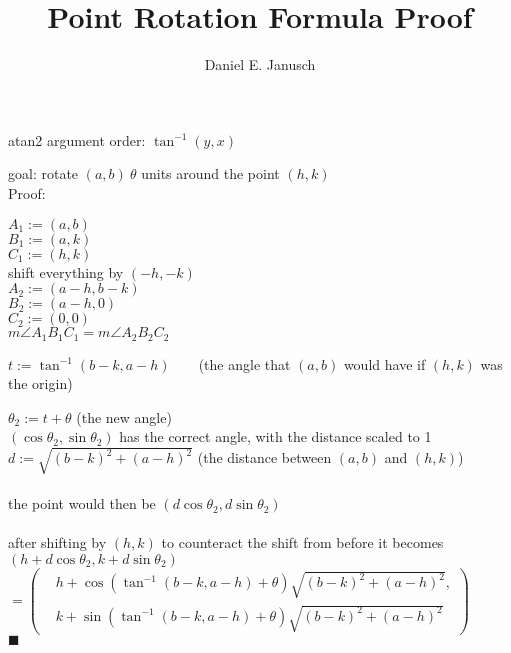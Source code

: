 \documentclass[12pt]{article}
\newcommand \pgrp [1]{\left( #1 \right)}
\begin{document}
\title{Point Rotation Formula Proof}
\author{Daniel E. Janusch}
\maketitle

\noindent atan2 argument order: $\tan^{-1}(y, x)$

\noindent goal: rotate $(a ,b)~\theta$ units around the point $(h, k)$\\

\noindent Proof:

\noindent $A_1 := (a, b)$\\
$B_1 := (a, k)$\\
$C_1 := (h, k)$\\

\noindent shift everything by $(-h,-k)$\\
$A_2 := (a - h, b - k)$\\
$B_2 := (a - h, 0)$\\
$C_2 := (0, 0)$\\

\noindent $m\angle A_1 B_1 C_1 = m\angle A_2 B_2 C_2$

\noindent $t := \tan^{-1}\!\pgrp{b - k, a - h}$~~~~(the angle that $(a, b)$ would have if $(h, k)$ was the origin)

\noindent $\theta_2 := t + \theta$ (the new angle)\\
$(\cos \theta_2, \sin\theta_2)$ has the correct angle, with the distance scaled to 1\\

\noindent $d := \sqrt{\pgrp{b - k}^2 + \pgrp{a - h}^2}$ (the distance between $(a,b)$ and $(h,k)$)\\
\\
the point would then be $(d\cos\theta_2,d\sin\theta_2)$\\
\\
after shifting by $(h,k)$ to counteract the shift from before it becomes
$(h + d \cos \theta_2, k + d \sin \theta_2)$\\
$ = \pgrp{\begin{aligned}
	& h + \cos\pgrp{\tan^{-1}\!\pgrp{b-k, a-h} + \theta} \sqrt{\pgrp{b-k}^2 + \pgrp{a-h}^2},\\
	& k + \sin\pgrp{\tan^{-1}\!\pgrp{b-k, a-h} + \theta} \sqrt{\pgrp{b-k}^2 + \pgrp{a-h}^2}
\end{aligned}}$\\

\noindent $\blacksquare$

\vfill
\scriptsize
\noindent{}\\
\vspace{-10px}
\end{document}
